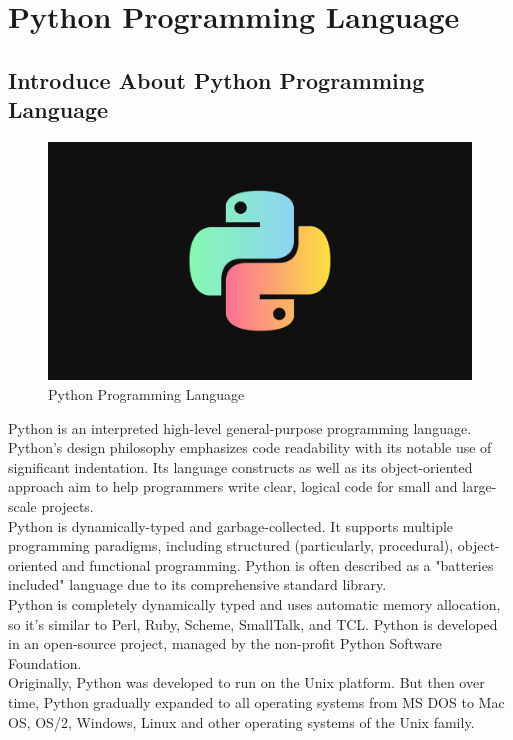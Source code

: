 \section{Python Programming Language}
    \subsection{Introduce About Python Programming Language}
        \begin{figure}[H]
            \centering
            \includegraphics[width=0.8\linewidth]{img/python-logo.jpg}
            \caption{Python Programming Language}
            \label{fig:python}
        \end{figure}
        Python is an interpreted high-level general-purpose programming language. Python's design philosophy emphasizes code readability 
        with its notable use of significant indentation. Its language constructs as well as its object-oriented approach aim to help programmers 
        write clear, logical code for small and large-scale projects. \\
        \vspace{3mm}
        Python is dynamically-typed and garbage-collected. It supports multiple programming paradigms, including structured (particularly, procedural), 
        object-oriented and functional programming. Python is often described as a "batteries included" language due to its comprehensive standard library. \\
        \vspace{3mm}
        Python is completely dynamically typed and uses automatic memory allocation, so it's similar to Perl, Ruby, Scheme, SmallTalk, and TCL. Python is 
        developed in an open-source project, managed by the non-profit Python Software Foundation. \\
        \vspace{3mm}
        Originally, Python was developed to run on the Unix platform. But then over time, Python gradually expanded to all operating systems from MS DOS to 
        Mac OS, OS/2, Windows, Linux and other operating systems of the Unix family.
